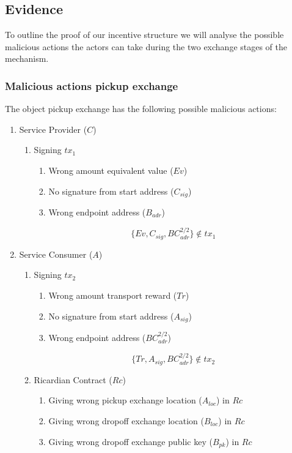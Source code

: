\subsection{Evidence}

To outline the proof of our incentive structure we will analyse the possible malicious actions the actors can take during the two exchange stages of the mechanism.

\subsubsection{Malicious actions pickup exchange}

The object pickup exchange has the following possible malicious actions:
\begin{enumerate}
  \item Service Provider ($C$)
  \begin{enumerate}
    \item Signing $tx_1$
    \begin{enumerate}
      \item Wrong amount equivalent value ($Ev$)
      \item No signature from start address ($C_{sig}$)
      \item Wrong endpoint address ($B_{adr}$)
    \end{enumerate}
    \[\{Ev, C_{sig}, BC_{adr}^{2/2}\}\not\in tx_1\]
  \end{enumerate}
  \item Service Consumer ($A$)
  \begin{enumerate}
    \item Signing $tx_2$
    \begin{enumerate}
      \item Wrong amount transport reward ($Tr$)
      \item No signature from start address ($A_{sig}$)
      \item Wrong endpoint address ($BC_{adr}^{2/2}$)
    \end{enumerate}
    \[\{Tr, A_{sig}, BC_{adr}^{2/2}\}\not\in tx_2\]
    \item Ricardian Contract ($Rc$)
    \begin{enumerate}
      \item Giving wrong pickup exchange location ($A_{loc}$) in $Rc$
      \item Giving wrong dropoff exchange location ($B_{loc}$) in $Rc$
      \item Giving wrong dropoff exchange public key ($B_{pk}$) in $Rc$

\end{enumerate}
\end{enumerate}
\end{enumerate}
